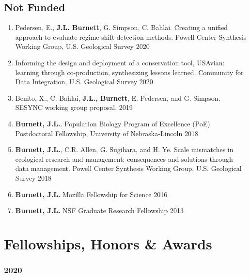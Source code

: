 \documentclass[11pt,]{article}
\providecommand{\tightlist}{%
  \setlength{\itemsep}{0pt}\setlength{\parskip}{0pt}}
\begin{document}
\hypertarget{not-funded}{%
\subsection{Not Funded}\label{not-funded}}

\begin{enumerate}
\def\labelenumi{\arabic{enumi}.}
\tightlist
\item
  Pedersen, E., \textbf{J.L. Burnett}, G. Simpson, C. Bahlai. Creating a
  unified approach to evaluate regime shift detection methods. Powell
  Center Synthesis Working Group, U.S. Geological Survey \hfill 2020 
\item
  Informing the design and deployment of a conservation tool, USAvian:
  learning through co-production, synthesizing lessons learned.
  Community for Data Integration, U.S. Geological Survey \hfill 2020 
\item
  Benito, X., C. Bahlai, \textbf{J.L., Burnett}, E. Pedersen, and G.
  Simpson. SESYNC working group proposal. \hfill  2019\\
\item
  \textbf{Burnett, J.L.}. Population Biology Program of Excellence (PoE)
  Postdoctoral Fellowship, University of Nebraska-Lincoln \hfill 2018\\
\item
  \textbf{Burnett, J.L.}, C.R. Allen, G. Sugihara, and H. Ye. Scale
  mismatches in ecological research and management: consequences and
  solutions through data management. Powell Center Synthesis Working
  Group, U.S. Geological Survey \hfill 2018\\
\item
  \textbf{Burnett, J.L.} Mozilla Fellowship for Science \hfill 2016\\
\item
  \textbf{Burnett, J.L.} NSF Graduate Research Fellowship \hfill 2013
\end{enumerate}

\hypertarget{fellowships-honors-awards}{%
\section{Fellowships, Honors \&
Awards}\label{fellowships-honors-awards}}

\hypertarget{section}{%
\subsubsection{2020}\label{section}}
\end{document}
